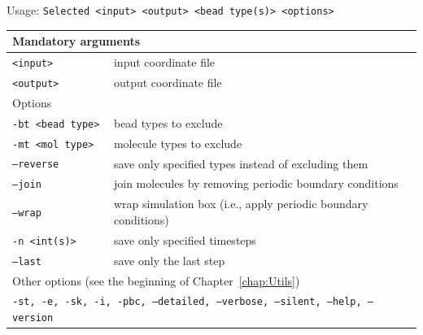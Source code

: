 \vspace{1em}
\noindent
Usage: \tt{Selected <input> <output> <bead type(s)> <options>}
\noindent
\begin{longtable}{p{}p{}}
  \toprule
  \multicolumn{2}{l}{Mandatory arguments}\\
  \midrule
  \tt{<input>}        & input coordinate file\\
  \tt{<output>}       & output coordinate file\\
  \midrule
  \multicolumn{2}{l}{Options}\\
  \midrule
  \tt{-bt <bead type>} & bead types to exclude\\
  \tt{-mt <mol type>}  & molecule types to exclude\\
  \tt{--reverse}       & save only specified types instead of excluding them\\
  \tt{--join}          & join molecules by removing periodic boundary
                         conditions\\
  \tt{--wrap}          & wrap simulation box (i.e., apply periodic boundary
                         conditions)\\
  \tt{-n <int(s)>}     & save only specified timesteps\\
  \tt{--last}          & save only the last step\\
  \midrule
  \multicolumn{2}{l}{Other options (see the beginning of 
                     Chapter~\ref{chap:Utils})}\\
  \midrule
  \multicolumn{2}{l}{\tt{-st},
                     \tt{-e},
                     \tt{-sk},
                     \tt{-i},
                     \tt{-pbc},
                     \tt{--detailed},
                     \tt{--verbose},
                     \tt{--silent},
                     \tt{--help},
                     \tt{--version}}\\
  \bottomrule
\end{longtable}
